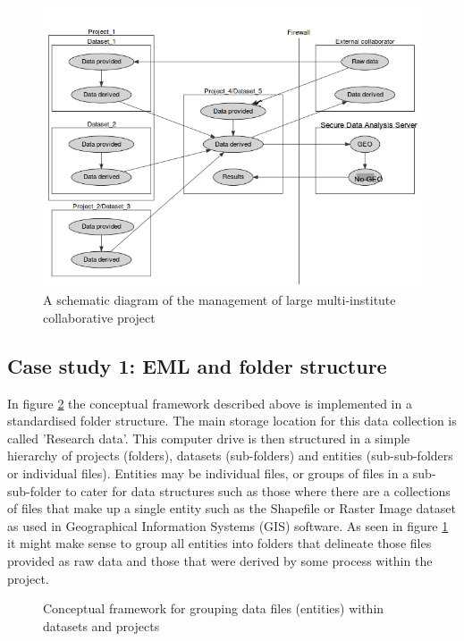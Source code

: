 \documentclass[11pt,a4paper]{article}
\begin{document}
\begin{figure}[!h]
\centering
\includegraphics[width=\textwidth]{images/file_name.png}
\caption{A schematic diagram of the management of large multi-institute collaborative project}
\label{fig:file_name}
\end{figure}

\subsection{Case study 1: EML and folder structure}

In figure \ref{fig:M2} the conceptual framework described above is implemented in a standardised folder structure.  The main storage location for this data collection is called 'Research data'.  
This computer drive is then structured in a simple hierarchy of projects (folders), datasets (sub-folders) and entities (sub-sub-folders or individual files).  Entities may be individual files, or groups of files in a sub-sub-folder to cater for data structures such as those where there are a collections of files that make up a single entity such as the Shapefile or Raster Image dataset as used in Geographical Information Systems (GIS) software.  As seen in figure \ref{fig:file_name} it might make sense to group all entities into folders that delineate those files provided as raw data and those that were derived by some process within the project.

\begin{figure}[!h]
\centering
{}
\caption{Conceptual framework for grouping data files (entities) within datasets and projects} \label{fig:M2}
\end{figure}
\end{document}
